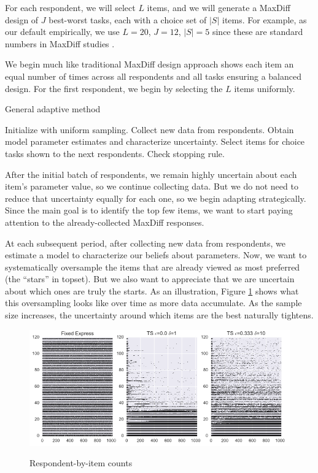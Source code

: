 \documentclass[a4paper,12pt]{article}
\newcommand{\numperset}{L}
\begin{document}
For each respondent, we will select $\numperset$ items, and we will generate a MaxDiff design of $J$ best-worst tasks, each with a choice set of $|S|$ items. For example, as our default empirically, we use $\numperset=20$, $J=12$, $|S|=5$ since these are standard numbers in MaxDiff studies \citep{wirth2012largeset}. 

We begin much like traditional MaxDiff design approach shows each item an equal number of times across all respondents and all tasks ensuring a balanced design.  For the first respondent, we begin by selecting the $\numperset$ items uniformly. 


\begin{algorithm}
\caption{General adaptive method} \label{alg:general}
\begin{algorithmic}[1]
\State Initialize with uniform sampling.
\State Collect new data from respondents.
\State Obtain model parameter estimates and characterize uncertainty.
\State Select items for choice tasks shown to the next respondents.
\State Check stopping rule.
\end{algorithmic}
\end{algorithm}



After the initial batch of respondents, we remain highly uncertain about each item's parameter value, so we continue collecting data. But we do not need to reduce that uncertainty equally for each one, so we begin adapting strategically. Since the main goal is to identify the top few items, we want to start paying attention to the already-collected MaxDiff responses.

At each subsequent period, after collecting new data from respondents, we estimate a model to characterize our beliefs about parameters. Now, we want to systematically oversample the items that are already viewed as most preferred (the ``stars'' in topset). But we also want to appreciate that we are uncertain about which ones are truly the starts. As an illustration, Figure \ref{fig:dots} shows what this oversampling looks like over time as more data accumulate. As the sample size increases, the uncertainty around which items are the best naturally tightens.

\begin{figure}[!ht]
\caption{Respondent-by-item counts}
\includegraphics[width=1\textwidth]{plots/3dotplot-lowres.png}
\label{fig:dots}
\end{figure}
\end{document}
